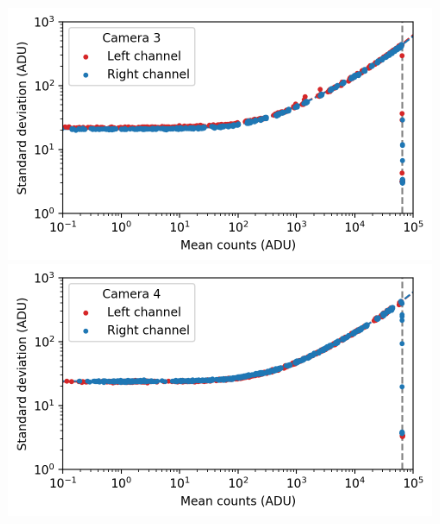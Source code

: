 \begin{colsection}
\begin{colsection}
\begin{figure}[p]
\begin{center}
        \begin{minipage}[t]{0.49\textwidth}\vspace{10pt}
            \includegraphics[width=\linewidth]{images/detectors/ptc_3.png}
        \end{minipage}
        \begin{minipage}[t]{0.49\textwidth}\vspace{10pt}
            \includegraphics[width=\linewidth]{images/detectors/ptc_4.png}
        \end{minipage}


\end{center}
\end{figure}
\end{colsection}
\end{colsection}
